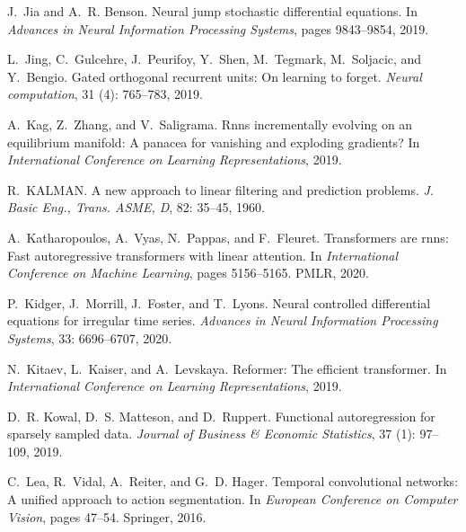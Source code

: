 \documentclass{MITcsail}
\begin{document}
\begin{thebibliography}{96}
J.~Jia and A.~R. Benson.
\newblock Neural jump stochastic differential equations.
\newblock In \emph{Advances in Neural Information Processing Systems}, pages
  9843--9854, 2019.

L.~Jing, C.~Gulcehre, J.~Peurifoy, Y.~Shen, M.~Tegmark, M.~Soljacic, and
  Y.~Bengio.
\newblock Gated orthogonal recurrent units: On learning to forget.
\newblock \emph{Neural computation}, 31 (4): 765--783, 2019.

A.~Kag, Z.~Zhang, and V.~Saligrama.
\newblock Rnns incrementally evolving on an equilibrium manifold: A panacea for
  vanishing and exploding gradients?
\newblock In \emph{International Conference on Learning Representations}, 2019.

R.~KALMAN.
\newblock A new approach to linear filtering and prediction problems.
\newblock \emph{J. Basic Eng., Trans. ASME, D}, 82: 35--45, 1960.

A.~Katharopoulos, A.~Vyas, N.~Pappas, and F.~Fleuret.
\newblock Transformers are rnns: Fast autoregressive transformers with linear
  attention.
\newblock In \emph{International Conference on Machine Learning}, pages
  5156--5165. PMLR, 2020.

P.~Kidger, J.~Morrill, J.~Foster, and T.~Lyons.
\newblock Neural controlled differential equations for irregular time series.
\newblock \emph{Advances in Neural Information Processing Systems},
  33: 6696--6707, 2020.

N.~Kitaev, L.~Kaiser, and A.~Levskaya.
\newblock Reformer: The efficient transformer.
\newblock In \emph{International Conference on Learning Representations}, 2019.

D.~R. Kowal, D.~S. Matteson, and D.~Ruppert.
\newblock Functional autoregression for sparsely sampled data.
\newblock \emph{Journal of Business \& Economic Statistics}, 37
  (1): 97--109, 2019.

C.~Lea, R.~Vidal, A.~Reiter, and G.~D. Hager.
\newblock Temporal convolutional networks: A unified approach to action
  segmentation.
\newblock In \emph{European Conference on Computer Vision}, pages 47--54.
  Springer, 2016.


\end{thebibliography}
\end{document}
